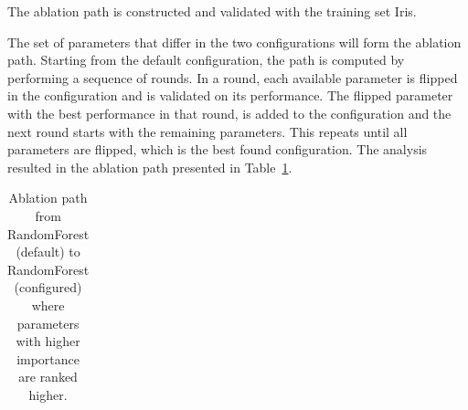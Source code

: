 \documentclass[british]{article}
\newif\iftest
\newif\ifablation
\begin{document}

\fi %

\ifablation
    \section{Parameter importance via Ablation}

    Ablation analysis~\cite{FawcettHoos16} is performed from the RandomForest (default) to RandomForest (configured) to see which parameter changes between them contribute most to the improved performance.
    \iftest
    The ablation path uses the training set Iris and validation is perform on the test set @@instanceSetTest@@.
    \else
    The ablation path is constructed and validated with the training set Iris.
    \fi
    The set of parameters that differ in the two configurations will form the ablation path.
    Starting from the default configuration, the path is computed by performing a sequence of rounds.
    In a round, each available parameter is flipped in the configuration and is validated on its performance.
    The flipped parameter with the best performance in that round, is added to the configuration and the next round starts with the remaining parameters.
    This repeats until all parameters are flipped, which is the best found configuration.
    The analysis resulted in the ablation path presented in Table~\ref{table:ablationpath}.


    \begin{table}[htbp]
        \caption{Ablation path from RandomForest (default) to RandomForest (configured) where parameters with higher importance are ranked higher.}
        \label{table:ablationpath}
        \begin{center}
        \footnotesize
            \begin{tabular}{rp{0.25\linewidth}rrr}\end{tabular}
        \end{center}
    \end{table}

\fi %



\end{document}

